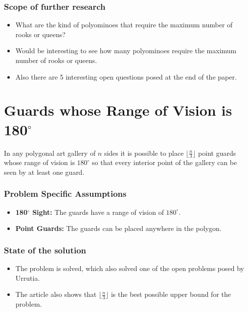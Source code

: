 \documentclass{Assignment}
\begin{document}
\vspace{-0.8cm}
\subsubsection*{Scope of further research}
\vspace{-0.3cm}
\begin{itemize}
    \itemsep-0.3em
    \item What are the kind of polyominoes that require the maximum number of rooks or queens?
    \item Would be interesting to see how many polyominoes require the maximum number of rooks or queens.
    \item Also there are 5 interesting open questions posed at the end of the paper.
\end{itemize}
\vspace{-0.7cm}
\section*{Guards whose Range of Vision is 180$^{\circ}$\supercite{180_guard_vision}}
\begin{problem}
    In any polygonal art gallery of $n$ sides it is possible to place $\lfloor \frac n3 \rfloor$ point guards whose range of vision is $180^{\circ}$ so that every interior point of the gallery can be seen by at least one guard.
\end{problem}
\vspace{-0.8cm}
\subsubsection*{Problem Specific Assumptions}
\vspace{-0.3cm}
\begin{itemize}
    \itemsep-0.3em
    \item {\bf 180$^\circ$ Sight:} The guards have a range of vision of $180^{\circ}$.
    \item {\bf Point Guards:} The guards can be placed anywhere in the polygon.
\end{itemize}
\vspace{-0.8cm}
\subsubsection*{State of the solution}
\vspace{-0.3cm}
\begin{itemize}
    \itemsep-0.3em
    \item The problem is solved, which also solved one of the open problems posed by Urrutia.
    \item The article also shows that $\lfloor \frac n3 \rfloor$ is the best possible upper bound for the problem.
\end{itemize}
\vspace{-0.8cm}
\end{document}
